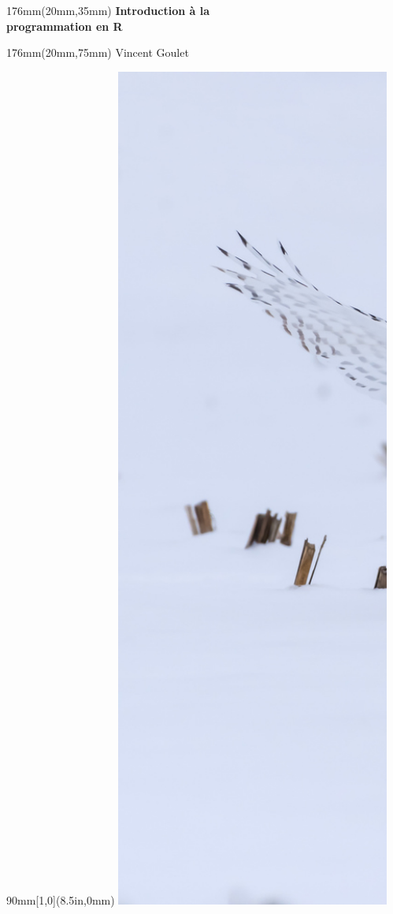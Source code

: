 \documentclass[letterpaper,11pt]{memoir}
\begin{document}
\begin{textblock*}{176mm}(20mm,35mm)
  \sffamily
  \bfseries\fontsize{42}{42}\selectfont
  Introduction à la \\
  programmation en R
\end{textblock*}

\begin{textblock*}{176mm}(20mm,75mm)
  \sffamily
  \fontsize{24}{24}\selectfont
  Vincent Goulet
\end{textblock*}

\mbox{}

\newpage

\begin{textblock*}{90mm}[1,0](8.5in,0mm)
  \includegraphics[height=11in,keepaspectratio=true]{Fotolia_99831160-arriere.jpg} \\
\end{textblock*}
\end{document}
